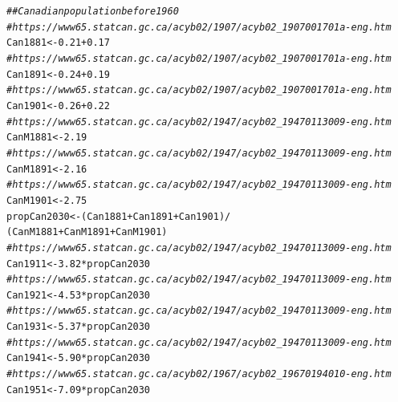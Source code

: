 \documentclass[11pt]{article}\usepackage[]{graphicx}\usepackage[]{color}
\makeatletter
\newcommand{\hlnum}[1]{\textcolor[rgb]{0.686,0.059,0.569}{#1}}%
\newcommand{\hlcom}[1]{\textcolor[rgb]{0.678,0.584,0.686}{\textit{#1}}}%
\newcommand{\hlopt}[1]{\textcolor[rgb]{0,0,0}{#1}}%
\newcommand{\hlstd}[1]{\textcolor[rgb]{0.345,0.345,0.345}{#1}}%
\newcommand{\hlkwb}[1]{\textcolor[rgb]{0.69,0.353,0.396}{#1}}%
\newenvironment{kframe}{%
 \def\at@end@of@kframe{}%
 \ifinner\ifhmode%
  \def\at@end@of@kframe{\end{minipage}}%
  \begin{minipage}{\columnwidth}%
 \fi\fi%
 \def\FrameCommand##1{\hskip\@totalleftmargin \hskip-\fboxsep
 \colorbox{shadecolor}{##1}\hskip-\fboxsep
     \hskip-\linewidth \hskip-\@totalleftmargin \hskip\columnwidth}%
 \MakeFramed {\advance\hsize-\width
   \@totalleftmargin\z@ \linewidth\hsize
   \@setminipage}}%
 {\par\unskip\endMakeFramed%
 \at@end@of@kframe}
\newenvironment{knitrout}{}{} %
\makeatother
\begin{document}
\begin{knitrout}
\color{fgcolor}\begin{kframe}
\begin{alltt}
\hlcom{## Canadian population before 1960}
\hlcom{#https://www65.statcan.gc.ca/acyb02/1907/acyb02_1907001701a-eng.htm}
\hlstd{Can1881} \hlkwb{<-} \hlnum{0.21} \hlopt{+} \hlnum{0.17}
\hlcom{#https://www65.statcan.gc.ca/acyb02/1907/acyb02_1907001701a-eng.htm}
\hlstd{Can1891} \hlkwb{<-} \hlnum{0.24} \hlopt{+} \hlnum{0.19}
\hlcom{#https://www65.statcan.gc.ca/acyb02/1907/acyb02_1907001701a-eng.htm}
\hlstd{Can1901} \hlkwb{<-} \hlnum{0.26} \hlopt{+} \hlnum{0.22}
\hlcom{#https://www65.statcan.gc.ca/acyb02/1947/acyb02_19470113009-eng.htm}
\hlstd{CanM1881} \hlkwb{<-} \hlnum{2.19}
\hlcom{#https://www65.statcan.gc.ca/acyb02/1947/acyb02_19470113009-eng.htm}
\hlstd{CanM1891} \hlkwb{<-} \hlnum{2.16}
\hlcom{#https://www65.statcan.gc.ca/acyb02/1947/acyb02_19470113009-eng.htm}
\hlstd{CanM1901} \hlkwb{<-} \hlnum{2.75}
\hlstd{propCan2030} \hlkwb{<-} \hlstd{(Can1881} \hlopt{+} \hlstd{Can1891} \hlopt{+} \hlstd{Can1901)} \hlopt{/}
  \hlstd{(CanM1881} \hlopt{+} \hlstd{CanM1891} \hlopt{+} \hlstd{CanM1901)}
\hlcom{#https://www65.statcan.gc.ca/acyb02/1947/acyb02_19470113009-eng.htm}
\hlstd{Can1911} \hlkwb{<-} \hlnum{3.82} \hlopt{*} \hlstd{propCan2030}
\hlcom{#https://www65.statcan.gc.ca/acyb02/1947/acyb02_19470113009-eng.htm}
\hlstd{Can1921} \hlkwb{<-} \hlnum{4.53} \hlopt{*} \hlstd{propCan2030}
\hlcom{#https://www65.statcan.gc.ca/acyb02/1947/acyb02_19470113009-eng.htm}
\hlstd{Can1931} \hlkwb{<-} \hlnum{5.37} \hlopt{*} \hlstd{propCan2030}
\hlcom{#https://www65.statcan.gc.ca/acyb02/1947/acyb02_19470113009-eng.htm}
\hlstd{Can1941} \hlkwb{<-} \hlnum{5.90} \hlopt{*} \hlstd{propCan2030}
\hlcom{#https://www65.statcan.gc.ca/acyb02/1967/acyb02_19670194010-eng.htm}
\hlstd{Can1951} \hlkwb{<-} \hlnum{7.09} \hlopt{*} \hlstd{propCan2030}


\end{alltt}
\end{kframe}
\end{knitrout}
\end{document}
